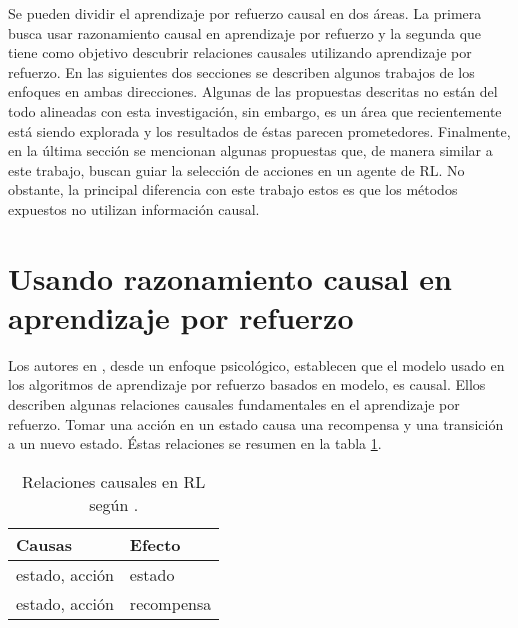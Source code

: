 Se pueden dividir el aprendizaje por refuerzo causal
en dos áreas. La primera busca usar razonamiento causal en aprendizaje por refuerzo y la segunda que tiene como objetivo descubrir relaciones causales utilizando aprendizaje por refuerzo. En las siguientes dos secciones se describen
algunos trabajos de los enfoques en ambas direcciones. Algunas de las
propuestas descritas no están del todo alineadas con esta investigación, sin embargo, es un área que recientemente está siendo explorada y los resultados de éstas parecen prometedores.
Finalmente, en la última sección se mencionan algunas propuestas que, de manera similar a este trabajo, buscan guiar la selección de acciones en un agente de RL. No obstante, la principal diferencia con este trabajo estos es que los métodos expuestos no utilizan información causal.




\section{Usando razonamiento causal en aprendizaje por refuerzo}


Los autores en \cite{Gershman2017}, desde un enfoque psicológico, establecen que el modelo usado en los algoritmos de aprendizaje por refuerzo basados en modelo,
es causal.
Ellos describen algunas relaciones causales fundamentales en el aprendizaje por refuerzo. Tomar una acción en un estado causa una recompensa y una transición a un nuevo estado.
Éstas relaciones se resumen en la tabla \ref{table:causal-relationships}. 

\begin{table}[h]
\centering
\caption{Relaciones causales en RL según \cite{Gershman2017}.}
\label{table:causal-relationships}
\begin{tabular}{@{}ll@{}}
\toprule
Causas         & Efecto     \\ \midrule
estado, acción & estado     \\
estado, acción & recompensa \\ \bottomrule
\end{tabular}
\end{table}


